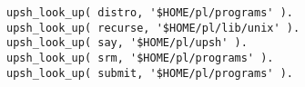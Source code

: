 \begin{verbatim}
upsh_look_up( distro, '$HOME/pl/programs' ).
upsh_look_up( recurse, '$HOME/pl/lib/unix' ).
upsh_look_up( say, '$HOME/pl/upsh' ).
upsh_look_up( srm, '$HOME/pl/programs' ).
upsh_look_up( submit, '$HOME/pl/programs' ).
\end{verbatim}
